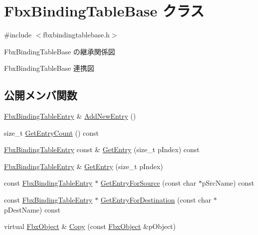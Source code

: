 \hypertarget{class_fbx_binding_table_base}{}\section{Fbx\+Binding\+Table\+Base クラス}
\label{class_fbx_binding_table_base}


{\ttfamily \#include $<$fbxbindingtablebase.\+h$>$}



Fbx\+Binding\+Table\+Base の継承関係図


Fbx\+Binding\+Table\+Base 連携図
\subsection*{公開メンバ関数}
\begin{DoxyCompactItemize}
\item 
\hyperlink{class_fbx_binding_table_entry}{Fbx\+Binding\+Table\+Entry} \& \hyperlink{class_fbx_binding_table_base_a2ebf180e80538abf0e6512a8ca30ee10}{Add\+New\+Entry} ()
\item 
size\+\_\+t \hyperlink{class_fbx_binding_table_base_a0a5379cd46e7e6dcf6f48bbd262034d8}{Get\+Entry\+Count} () const
\item 
\hyperlink{class_fbx_binding_table_entry}{Fbx\+Binding\+Table\+Entry} const  \& \hyperlink{class_fbx_binding_table_base_add6e787cc1decf0bfc57a2489cc96c1a}{Get\+Entry} (size\+\_\+t p\+Index) const
\item 
\hyperlink{class_fbx_binding_table_entry}{Fbx\+Binding\+Table\+Entry} \& \hyperlink{class_fbx_binding_table_base_a589d64fd21e06cb6206dfd290017b42a}{Get\+Entry} (size\+\_\+t p\+Index)
\item 
const \hyperlink{class_fbx_binding_table_entry}{Fbx\+Binding\+Table\+Entry} $\ast$ \hyperlink{class_fbx_binding_table_base_aa954d91bd7cf21ab56714414ca1e29f8}{Get\+Entry\+For\+Source} (const char $\ast$p\+Src\+Name) const
\item 
const \hyperlink{class_fbx_binding_table_entry}{Fbx\+Binding\+Table\+Entry} $\ast$ \hyperlink{class_fbx_binding_table_base_a458be38b5f0998c672d276989d278cb2}{Get\+Entry\+For\+Destination} (const char $\ast$p\+Dest\+Name) const
\item 
virtual \hyperlink{class_fbx_object}{Fbx\+Object} \& \hyperlink{class_fbx_binding_table_base_a9181d090913b604fd10a0a660a6e823b}{Copy} (const \hyperlink{class_fbx_object}{Fbx\+Object} \&p\+Object)
\end{DoxyCompactItemize}
